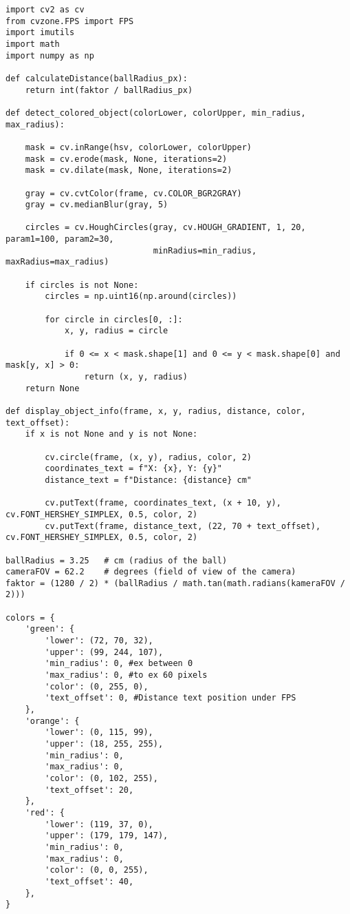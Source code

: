 \begin{lstlisting}[language=PythonPlus]
import cv2 as cv
from cvzone.FPS import FPS
import imutils
import math
import numpy as np

def calculateDistance(ballRadius_px):
    return int(faktor / ballRadius_px)

def detect_colored_object(colorLower, colorUpper, min_radius, max_radius):
    
    mask = cv.inRange(hsv, colorLower, colorUpper)
    mask = cv.erode(mask, None, iterations=2)
    mask = cv.dilate(mask, None, iterations=2)

    gray = cv.cvtColor(frame, cv.COLOR_BGR2GRAY)
    gray = cv.medianBlur(gray, 5)

    circles = cv.HoughCircles(gray, cv.HOUGH_GRADIENT, 1, 20, param1=100, param2=30,
                              minRadius=min_radius, maxRadius=max_radius)

    if circles is not None:
        circles = np.uint16(np.around(circles))

        for circle in circles[0, :]:
            x, y, radius = circle

            if 0 <= x < mask.shape[1] and 0 <= y < mask.shape[0] and mask[y, x] > 0:
                return (x, y, radius)
    return None

def display_object_info(frame, x, y, radius, distance, color, text_offset):
    if x is not None and y is not None:
       
        cv.circle(frame, (x, y), radius, color, 2)
        coordinates_text = f"X: {x}, Y: {y}"
        distance_text = f"Distance: {distance} cm"

        cv.putText(frame, coordinates_text, (x + 10, y), cv.FONT_HERSHEY_SIMPLEX, 0.5, color, 2)
        cv.putText(frame, distance_text, (22, 70 + text_offset), cv.FONT_HERSHEY_SIMPLEX, 0.5, color, 2)

ballRadius = 3.25   # cm (radius of the ball)
cameraFOV = 62.2    # degrees (field of view of the camera)
faktor = (1280 / 2) * (ballRadius / math.tan(math.radians(kameraFOV / 2)))

colors = {
    'green': {
        'lower': (72, 70, 32), 
        'upper': (99, 244, 107),
        'min_radius': 0, #ex between 0 
        'max_radius': 0, #to ex 60 pixels
        'color': (0, 255, 0), 
        'text_offset': 0, #Distance text position under FPS
    },
    'orange': {
        'lower': (0, 115, 99), 
        'upper': (18, 255, 255), 
        'min_radius': 0,
        'max_radius': 0,
        'color': (0, 102, 255), 
        'text_offset': 20, 
    },
    'red': {
        'lower': (119, 37, 0), 
        'upper': (179, 179, 147), 
        'min_radius': 0,
        'max_radius': 0,
        'color': (0, 0, 255), 
        'text_offset': 40,  
    },
}


\end{lstlisting}
